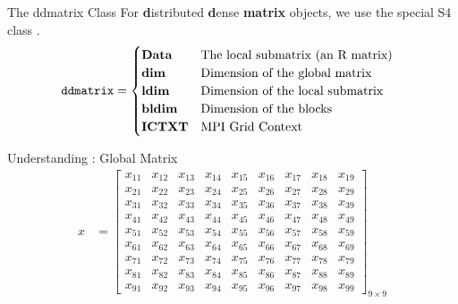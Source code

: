 \begin{frame}
  \begin{block}{The ddmatrix Class}\pause
    For \textbf{d}istributed \textbf{d}ense \textbf{matrix} objects,
    we use the special S4 class .
    \begin{align*}
      \hspace{.1cm}\text{\code{ddmatrix}}&=\begin{cases}
        $\textbf{Data}$ & $The local submatrix (an R matrix)$\\
        $\textbf{dim}$ & $Dimension of the global matrix$\\
        $\textbf{ldim}$ & $Dimension of the local submatrix$\\
        $\textbf{bldim}$ & $Dimension of the blocks$\\
        $\textbf{ICTXT}$ & $MPI Grid Context$
      \end{cases}
    \end{align*}
  \end{block}
\end{frame}

\begin{frame}
  \begin{exampleblock}{Understanding : Global Matrix}
    \begin{align*}
      x &= \left[
          \begin{array}{lllllllll}
            x_{11} & x_{12} & x_{13} & x_{14} & x_{15} & x_{16} & x_{17} & x  _{18} & x_{19}\\
            x_{21} & x_{22} & x_{23} & x_{24} & x_{25} & x_{26} & x_{27} & x  _{28} & x_{29}\\
            x_{31} & x_{32} & x_{33} & x_{34} & x_{35} & x_{36} & x_{37} & x  _{38} & x_{39}\\
            x_{41} & x_{42} & x_{43} & x_{44} & x_{45} & x_{46} & x_{47} & x  _{48} & x_{49}\\
            x_{51} & x_{52} & x_{53} & x_{54} & x_{55} & x_{56} & x_{57} & x  _{58} & x_{59}\\
            x_{61} & x_{62} & x_{63} & x_{64} & x_{65} & x_{66} & x_{67} & x  _{68} & x_{69}\\
            x_{71} & x_{72} & x_{73} & x_{74} & x_{75} & x_{76} & x_{77} & x  _{78} & x_{79}\\
            x_{81} & x_{82} & x_{83} & x_{84} & x_{85} & x_{86} & x_{87} & x  _{88} & x_{89}\\
            x_{91} & x_{92} & x_{93} & x_{94} & x_{95} & x_{96} & x_{97} & x  _{98} & x_{99}
          \end{array}
        \right]_{9\times 9}
    \end{align*}
  \end{exampleblock}
\end{frame}

